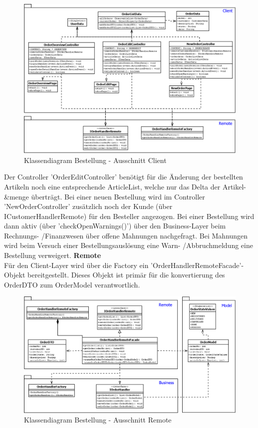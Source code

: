 \begin{figure}[H]
	\centering
	\includegraphics[width=1.0\linewidth]{Images/Class-Order-Client}
	\caption{Klassendiagram Bestellung - Ausschnitt Client}
	\label{fig:class-order-client}
\end{figure}
Der Controller 'OrderEditController' benötigt für die Änderung der bestellten Artikeln noch eine entsprechende ArticleList, welche nur das Delta der Artikel- \&menge überträgt. Bei einer neuen Bestellung wird im Controller 'NewOrderController' zusätzlich noch der Kunde (über ICustomerHandlerRemote) für den Besteller angezogen. Bei einer Bestellung wird dann aktiv (über 'checkOpenWarnings()') über den Business-Layer beim Rechnungs- /Finanzwesen über offene Mahnungen nachgefragt. Bei Mahnungen wird beim Versuch einer Bestellungsauslösung eine Warn- /Abbruchmeldung eine Bestellung verweigert.
\clearpage
\textbf{Remote}\\
Für den Client-Layer wird über die Factory ein 'OrderHandlerRemoteFacade'-Objekt bereitgestellt. Dieses Objekt ist primär für die konvertierung des OrderDTO zum OrderModel verantwortlich. 
\begin{figure}[H]
	\centering
	\includegraphics[width=1.0\linewidth]{Images/Class-Order-Remote}
	\caption{Klassendiagram Bestellung - Ausschnitt Remote}
	\label{fig:class-order-remote}
\end{figure}


